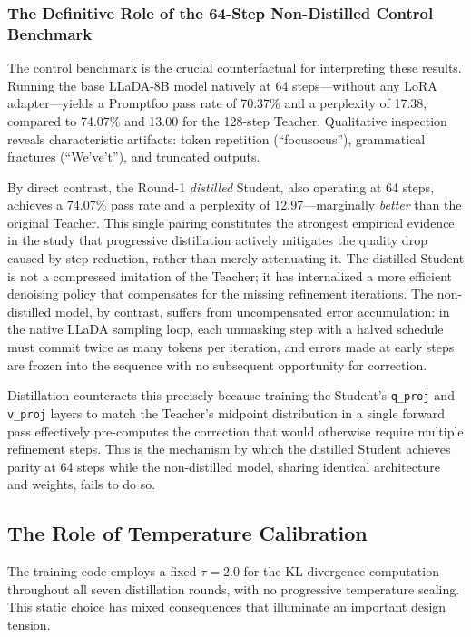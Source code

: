 \documentclass[11pt, a4paper]{article}
\begin{document}
\subsubsection{The Definitive Role of the 64-Step Non-Distilled Control Benchmark}

The control benchmark is the crucial counterfactual for interpreting these results. Running the base LLaDA-8B model natively at 64 steps---without any LoRA adapter---yields a Promptfoo pass rate of 70.37\% and a perplexity of 17.38, compared to 74.07\% and 13.00 for the 128-step Teacher. Qualitative inspection reveals characteristic artifacts: token repetition (``focusocus''), grammatical fractures (``We've't''), and truncated outputs.

By direct contrast, the Round-1 \emph{distilled} Student, also operating at 64 steps, achieves a 74.07\% pass rate and a perplexity of 12.97---marginally \emph{better} than the original Teacher. This single pairing constitutes the strongest empirical evidence in the study that progressive distillation actively mitigates the quality drop caused by step reduction, rather than merely attenuating it. The distilled Student is not a compressed imitation of the Teacher; it has internalized a more efficient denoising policy that compensates for the missing refinement iterations. The non-distilled model, by contrast, suffers from uncompensated error accumulation: in the native LLaDA sampling loop, each unmasking step with a halved schedule must commit twice as many tokens per iteration, and errors made at early steps are frozen into the sequence with no subsequent opportunity for correction.

Distillation counteracts this precisely because training the Student's \texttt{q\_proj} and \texttt{v\_proj} layers to match the Teacher's midpoint distribution in a single forward pass effectively pre-computes the correction that would otherwise require multiple refinement steps. This is the mechanism by which the distilled Student achieves parity at 64 steps while the non-distilled model, sharing identical architecture and weights, fails to do so.

\subsection{The Role of Temperature Calibration}
\label{subsec:temperature_analysis}

The training code employs a fixed $\tau = 2.0$ for the KL divergence computation throughout all seven distillation rounds, with no progressive temperature scaling. This static choice has mixed consequences that illuminate an important design tension.
\end{document}
